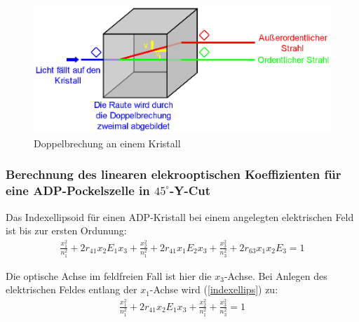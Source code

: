\documentclass[12pt]{article}
\begin{document}
\begin{figure}[H]
\centering
\includegraphics[width=1\linewidth]{pictures/doppelbrechung.eps}
\caption{Doppelbrechung an einem Kristall}
\end{figure}

\subsubsection[Berechnung des linearen elektrooptischen Koeffizienten]{Berechnung des linearen elekrooptischen Koeffizienten für eine ADP-Pockelszelle in $45^\circ$-Y-Cut}
Das Indexellipsoid für einen ADP-Kristall bei einem angelegten elektrischen Feld ist bis zur ersten Ordunung:
\begin{align}
\label{indexellips}
 \frac{x_1^2}{n_1^2} + 2 r_{41} x_2 E_1 x_3 + \frac{x_2^2}{n_1^2} + 2 r_{41} x_1 E_2 x_3 + \frac{x_3^2}{n_3^2} + 2 r_{63} x_1 x_2 E_3 = 1
\end{align}

Die optische Achse im feldfreien Fall ist hier die $x_3$-Achse. Bei Anlegen des elektrischen Feldes entlang der $x_1$-Achse wird (\ref{indexellips}) zu:
\begin{align}
 \frac{x_1^2}{n_1^2} + 2 r_{41} x_2 E_1 x_3 + \frac{x_2^2}{n_1^2} + \frac{x_3^2}{n_3^2} = 1
\end{align}
\end{document}

